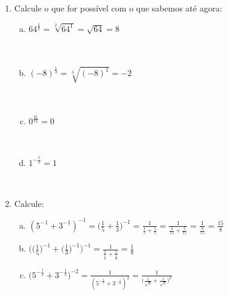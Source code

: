 \documentclass[a4paper,14pt]{article}
\begin{document}
\begin{multicols}{2}
\begin{enumerate}
\begin{enumerate}[a)]
        \end{enumerate}
        \item Calcule o que for possível com o que sabemos até agora:
        \begin{enumerate}[a)] 
        	\item $64^\frac{1}{2} = \sqrt[2]{64^1} = \sqrt{64} = 8$ \\\\\\
        	\item $(-8)^\frac{1}{3} = \sqrt[3]{(-8)^1} = -2$ \\\\\\
        	\item $0^\frac{31}{72} = 0$ \\\\\\
        	\item $1^{-\frac{5}{7}} = 1$ \\\\\\
        \end{enumerate}
        \item Calcule:
        \begin{enumerate}[a)]
        	\item $(5^{-1} + 3^{-1})^{-1} = \bigg(\frac{1}{5} + \frac{1}{3}\bigg)^{-1} = \frac{1}{\frac{1}{5}+\frac{1}{3}} = \frac{1}{\frac{3}{15}+\frac{5}{15}} = \frac{1}{\frac{8}{15}} = \frac{15}{8}$ \\
        	\item $\bigg(\bigg(\frac{1}{5}\bigg)^{-1} + \bigg(\frac{1}{3}\bigg)^{-1}\bigg)^{-1} = \frac{1}{\frac{1}{\frac{1}{5}}+\frac{1}{\frac{1}{3}}} = \frac{1}{8}$ \\
        	\item $\big(5^{-\frac{1}{2}} + 3^{-\frac{1}{2}}\big)^{-2} = \frac{1}{(5^{{-\frac{1}{2}}}+3^{-\frac{1}{2}})^2} = \frac{1}{\bigg({\frac{1}{\sqrt{3}}} + {\frac{1}{\sqrt{5}}} \bigg)^2}$
        \end{enumerate}
    \end{enumerate}        
    \end{multicols}    
\end{document}
